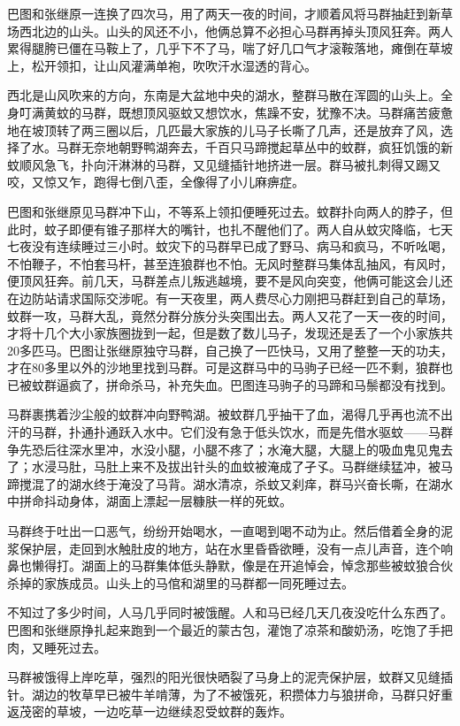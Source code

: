 \par 巴图和张继原一连换了四次马，用了两天一夜的时间，才顺着风将马群抽赶到新草场西北边的山头。山头的风还不小，他俩总算不必担心马群再掉头顶风狂奔。两人累得腿胯已僵在马鞍上了，几乎下不了马，喘了好几口气才滚鞍落地，瘫倒在草坡上，松开领扣，让山风灌满单袍，吹吹汗水湿透的背心。
\par 西北是山风吹来的方向，东南是大盆地中央的湖水，整群马散在浑圆的山头上。全身叮满黄蚊的马群，既想顶风驱蚊又想饮水，焦躁不安，犹豫不决。马群痛苦疲惫地在坡顶转了两三圈以后，几匹最大家族的儿马子长嘶了几声，还是放弃了风，选择了水。马群无奈地朝野鸭湖奔去，千百只马蹄搅起草丛中的蚊群，疯狂饥饿的新蚊顺风急飞，扑向汗淋淋的马群，又见缝插针地挤进一层。群马被扎刺得又踢又咬，又惊又乍，跑得七倒八歪，全像得了小儿麻痹症。
\par 巴图和张继原见马群冲下山，不等系上领扣便睡死过去。蚊群扑向两人的脖子，但此时，蚊子即便有锥子那样大的嘴针，也扎不醒他们了。两人自从蚊灾降临，七天七夜没有连续睡过三小时。蚊灾下的马群早已成了野马、病马和疯马，不听吆喝，不怕鞭子，不怕套马杆，甚至连狼群也不怕。无风时整群马集体乱抽风，有风时，便顶风狂奔。前几天，马群差点儿叛逃越境，要不是风向突变，他俩可能这会儿还在边防站请求国际交涉呢。有一天夜里，两人费尽心力刚把马群赶到自己的草场，蚊群一攻，马群大乱，竟然分群分族分头突围出去。两人又花了一天一夜的时间，才将十几个大小家族圈拢到一起，但是数了数儿马子，发现还是丢了一个小家族共20多匹马。巴图让张继原独守马群，自己换了一匹快马，又用了整整一天的功夫，才在80多里以外的沙地里找到马群。可是这群马中的马驹子已经一匹不剩，狼群也已被蚊群逼疯了，拼命杀马，补充失血。巴图连马驹子的马蹄和马鬃都没有找到。
\par 马群裹携着沙尘般的蚊群冲向野鸭湖。被蚊群几乎抽干了血，渴得几乎再也流不出汗的马群，扑通扑通跃入水中。它们没有急于低头饮水，而是先借水驱蚊——马群争先恐后往深水里冲，水没小腿，小腿不疼了；水淹大腿，大腿上的吸血鬼见鬼去了；水浸马肚，马肚上来不及拔出针头的血蚊被淹成了孑孓。马群继续猛冲，被马蹄搅混了的湖水终于淹没了马背。湖水清凉，杀蚊又刹痒，群马兴奋长嘶，在湖水中拼命抖动身体，湖面上漂起一层糠肤一样的死蚊。
\par 马群终于吐出一口恶气，纷纷开始喝水，一直喝到喝不动为止。然后借着全身的泥浆保护层，走回到水触肚皮的地方，站在水里昏昏欲睡，没有一点儿声音，连个响鼻也懒得打。湖面上的马群集体低头静默，像是在开追悼会，悼念那些被蚊狼合伙杀掉的家族成员。山头上的马倌和湖里的马群都一同死睡过去。
\par 不知过了多少时间，人马几乎同时被饿醒。人和马已经几天几夜没吃什么东西了。巴图和张继原挣扎起来跑到一个最近的蒙古包，灌饱了凉茶和酸奶汤，吃饱了手把肉，又睡死过去。
\par 马群被饿得上岸吃草，强烈的阳光很快晒裂了马身上的泥壳保护层，蚊群又见缝插针。湖边的牧草早已被牛羊啃薄，为了不被饿死，积攒体力与狼拼命，马群只好重返茂密的草坡，一边吃草一边继续忍受蚊群的轰炸。
